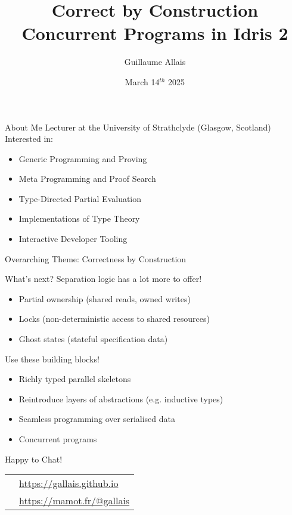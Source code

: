 \documentclass[3to2]{beamer}
\title{Correct by Construction Concurrent Programs \newline in Idris 2}
\author{Guillaume Allais}
\institute{University of Strathclyde \\ Glasgow, UK}
\date{March 14$^{th}$ 2025}
\newcommand{\bobhead}{\texttt{[image: assets/bob.png]}}
\newcommand{\mastodon}{\texttt{[image: assets/mastodon-logo-purple.png]}}
\newcommand{\globe}{\texttt{[image: assets/globe.png]}}
\begin{document}
\begin{frame}
  \maketitle
{}
\end{frame}

{
\begin{frame}{About Me}
  Lecturer at the University of Strathclyde (Glasgow, Scotland)
  \vfill
  Interested in:
  \begin{itemize}
    \item Generic Programming and Proving
    \item Meta Programming and Proof Search
    \item Type-Directed Partial Evaluation
    \item Implementations of Type Theory
    \item Interactive Developer Tooling
  \end{itemize}
  \vfill
  Overarching Theme: Correctness by Construction
\end{frame}}






\begin{frame}{What's next?}
Separation logic has a lot more to offer!

  \begin{itemize}
    \item Partial ownership (shared reads, owned writes)
    \item Locks (non-deterministic access to shared resources)
    \item Ghost states (stateful specification data)
  \end{itemize}

\vfill

Use these building blocks!

  \begin{itemize}
    \item Richly typed parallel skeletons
    \item Reintroduce layers of abstractions (e.g. inductive types)
    \item Seamless programming over serialised data
    \item Concurrent programs
  \end{itemize}
\end{frame}

\begin{frame}{Happy to Chat!}
  \Large\centering
  \renewcommand\UrlFont{}
  \begin{tabular}{ll}
    \raisebox{-2pt}{\globe} &  \url{https://gallais.github.io} \\
    \raisebox{-4pt}{\mastodon} & \url{https://mamot.fr/@gallais}
  \end{tabular}
\end{frame}
\end{document}
